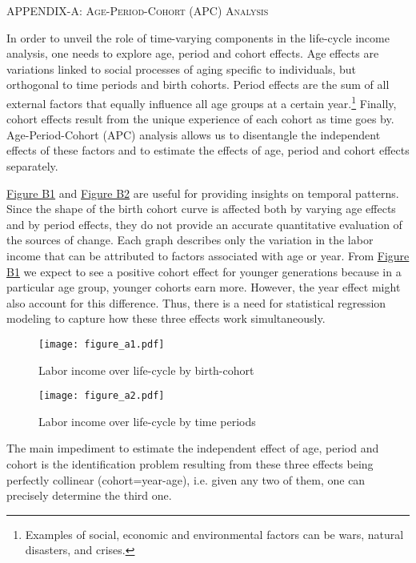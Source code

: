 \documentclass[12pt,author-year]{article}
\begin{document}
\begin{center}
	\label{AppendixA}
	\textsc{\large{APPENDIX-A: Age-Period-Cohort (APC) Analysis}}
\end{center}


In order to unveil the role of time-varying components in the life-cycle income analysis, one needs to explore age, period and cohort effects. Age effects are variations linked to social processes of aging specific to individuals, but orthogonal to time periods and birth cohorts. Period effects are the sum of all external factors that equally influence all age groups at a certain year.\footnote{Examples of social, economic and environmental factors can be wars, natural disasters, and crises.} Finally, cohort effects result from the unique experience of each cohort as time goes by. Age-Period-Cohort (APC) analysis allows us to disentangle the independent effects of these factors and to estimate the effects of age, period and cohort effects separately.

\hyperref[b-figure1]{Figure B1} and \hyperref[b-figure2]{Figure B2} are useful for providing insights on temporal patterns. Since the shape of the birth cohort curve is affected both by varying age effects and by period effects, they do not provide an accurate quantitative evaluation of the sources of change. Each graph describes only the variation in the labor income that can be attributed to factors associated with age or year. From \hyperref[b-figure1]{Figure B1} we expect to see a positive cohort effect for younger generations because in a particular age group, younger cohorts earn more. However, the year effect might also account for this difference. Thus, there is a need for statistical regression modeling to capture how these three effects work simultaneously.

\begin{figure}[htb]
	\label{a-figure1}
	\centering
	\texttt{[image: figure\_a1.pdf]}
	\caption{Labor income over life-cycle by birth-cohort}
\end{figure}

\begin{figure}[htb]
	\label{a-figure2}
	\centering
	\texttt{[image: figure\_a2.pdf]}
	\caption{Labor income over life-cycle by time periods}
\end{figure}
The main impediment to estimate the independent effect of age, period and cohort is the identification problem resulting from these three effects being perfectly collinear (cohort=year-age), i.e. given any two of them, one can precisely determine the third one. 
\end{document}
